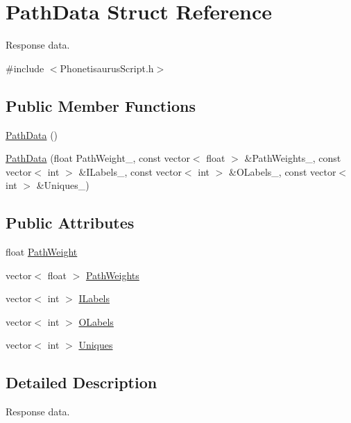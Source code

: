 \hypertarget{struct_path_data}{}\section{Path\+Data Struct Reference}
\label{struct_path_data}


Response data.  




{\ttfamily \#include $<$Phonetisaurus\+Script.\+h$>$}

\subsection*{Public Member Functions}
\begin{DoxyCompactItemize}
\item 
\hyperlink{struct_path_data_a80266979b3191ae07e6a616e2965e065}{Path\+Data} ()
\item 
\hyperlink{struct_path_data_adb70dbd2e03c2cbe8c6fd5709d13b883}{Path\+Data} (float Path\+Weight\+\_\+, const vector$<$ float $>$ \&Path\+Weights\+\_\+, const vector$<$ int $>$ \&I\+Labels\+\_\+, const vector$<$ int $>$ \&O\+Labels\+\_\+, const vector$<$ int $>$ \&Uniques\+\_\+)
\end{DoxyCompactItemize}
\subsection*{Public Attributes}
\begin{DoxyCompactItemize}
\item 
float \hyperlink{struct_path_data_af463d789fee9938ef3a00566ed0276c9}{Path\+Weight}
\item 
vector$<$ float $>$ \hyperlink{struct_path_data_a07ba2ece07b9fcb75cdd31b808185e94}{Path\+Weights}
\item 
vector$<$ int $>$ \hyperlink{struct_path_data_a143326b256da0614ac141ab12b90aa1f}{I\+Labels}
\item 
vector$<$ int $>$ \hyperlink{struct_path_data_a910a7d1236c05c6b2a67d6eab58260a7}{O\+Labels}
\item 
vector$<$ int $>$ \hyperlink{struct_path_data_a2e95adbdf68bb757b532c970bb1a2c9a}{Uniques}
\end{DoxyCompactItemize}


\subsection{Detailed Description}
Response data. 

